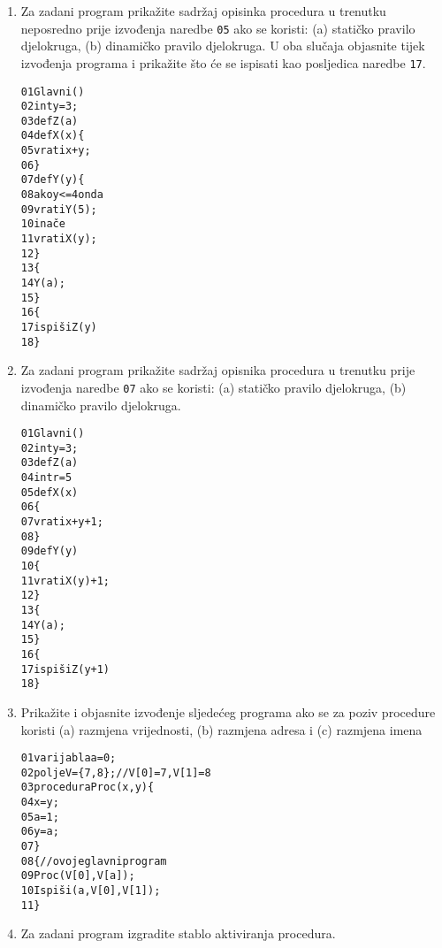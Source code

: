 \documentclass[times, 12pt, utf8]{book}
\begin{document}
\begin{enumerate}[resume]
\item
Za zadani program prikažite sadržaj opisinka procedura u trenutku neposredno prije izvođenja naredbe \texttt{05} ako se koristi: (a) statičko pravilo djelokruga, (b) dinamičko pravilo djelokruga.
U oba slučaja objasnite tijek izvođenja programa i prikažite što će se ispisati kao posljedica naredbe \texttt{17}. \cite[str.~234-242]{udzbenik} \cite{auditorne}

\begin{alltt}
01  Glavni()
02    int y = 3;
03    def Z(a)
04      def X(x)\verb|{|
05        vrati x+y;
06      \verb|}|
07      def Y(y)\verb|{|
08        ako y <= 4 onda
09          vrati Y(5);
10        inače
11          vrati X(y);
12      \verb|}|
13    \verb|{|
14      Y(a);
15    \verb|}|
16  \verb|{|
17    ispiši Z(y)
18  \verb|}|
\end{alltt} 

\item
Za zadani program prikažite sadržaj opisnika procedura u trenutku prije izvođenja naredbe \texttt{07} ako se koristi: (a) statičko pravilo djelokruga, (b) dinamičko pravilo djelokruga. \cite[str.~234-242]{udzbenik} \cite{auditorne}

\begin{alltt}
01  Glavni()
02    int y = 3;
03    def Z(a)
04      int r = 5
05      def X(x)
06      \verb|{|
07        vrati x+y+1;
08      \verb|}|
09      def Y(y)
10      \verb|{|
11        vrati X(y)+1;
12      \verb|}|
13    \verb|{|
14      Y(a);
15    \verb|}|
16  \verb|{|
17    ispiši Z(y+1)
18  \verb|}|
\end{alltt} 

\item
Prikažite i objasnite izvođenje sljedećeg programa ako se za poziv procedure koristi (a) razmjena vrijednosti, (b) razmjena adresa i (c) razmjena imena \cite[str.~243-252]{udzbenik} \cite{auditorne}

\begin{alltt}
01  varijabla a = 0;
02  polje V = \verb|{|7, 8\verb|}|; // V[0]=7, V[1]=8
03  procedura Proc(x, y) \verb|{|
04    x = y;
05    a = 1;
06    y = a;
07  \verb|}|
08  \verb|{| // ovo je glavni program
09    Proc(V[0], V[a]);
10    Ispiši(a, V[0], V[1]);
11  \verb|}|
\end{alltt} 

\item
Za zadani program izgradite stablo aktiviranja procedura. \cite[str.~228-229]{udzbenik} \cite{auditorne}


\end{enumerate}
\end{document}
